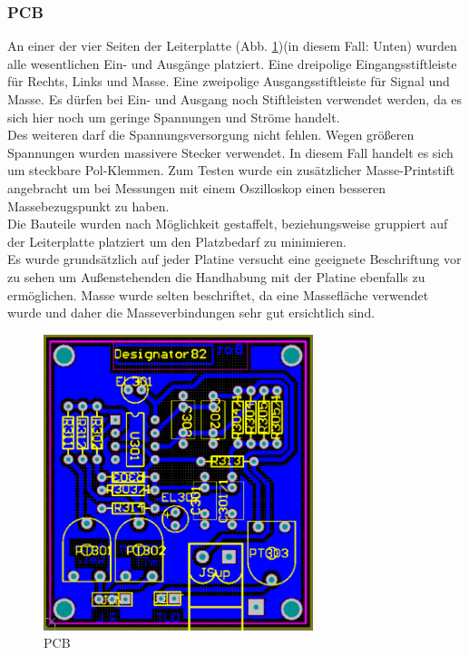\subsubsection{PCB}\label{subsec:4.2.3}
An einer der vier Seiten der Leiterplatte (Abb. \ref{fig:4.2.3.1})(in diesem Fall: Unten) wurden alle wesentlichen Ein- und Ausgänge platziert.
Eine dreipolige Eingangsstiftleiste für Rechts, Links und Masse.
Eine zweipolige Ausgangsstiftleiste für Signal und Masse.
Es dürfen bei Ein- und Ausgang noch Stiftleisten verwendet werden, da es sich hier noch um geringe Spannungen und Ströme handelt.\\
Des weiteren darf die Spannungsversorgung nicht fehlen.
Wegen größeren Spannungen wurden massivere Stecker verwendet.
In diesem Fall handelt es sich um steckbare Pol-Klemmen.
Zum Testen wurde ein zusätzlicher Masse-Printstift angebracht um bei Messungen mit einem Oszilloskop einen besseren Massebezugspunkt zu haben.\\
Die Bauteile wurden nach Möglichkeit gestaffelt, beziehungsweise gruppiert auf der Leiterplatte platziert um den Platzbedarf zu minimieren.\\
Es wurde grundsätzlich auf jeder Platine versucht eine geeignete Beschriftung vor zu sehen um Außenstehenden die Handhabung mit der Platine ebenfalls zu ermöglichen. Masse wurde selten beschriftet, da eine Massefläche verwendet wurde und daher die Masseverbindungen sehr gut ersichtlich sind.
\begin{figure} [H]
	\centering
	\includegraphics[width=0.7\textwidth]{img/Print3/3mTTWeicheruAddierer-PCB.PNG}
	\caption{PCB}
	\label {fig:4.2.3.1}
\end{figure}














